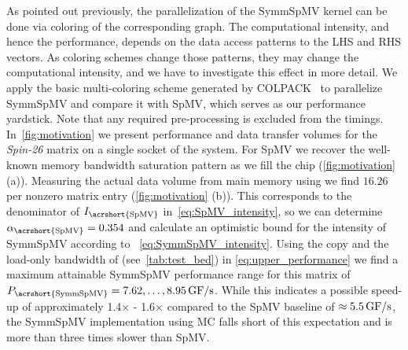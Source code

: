 
As pointed out previously, the parallelization of
the \acrshort{SymmSpMV} kernel can be done
via \DTWO coloring of the corresponding graph. The computational
intensity, and hence the performance, depends on the data access
patterns to the LHS and RHS vectors. As coloring schemes change those
patterns, they may change the computational intensity, and we have to
investigate this effect in more detail. We apply the basic
multi-coloring scheme generated by COLPACK~\cite{COLPACK} to
parallelize \acrshort{SymmSpMV} and compare it with \acrshort{SpMV},
which serves as our performance yardstick. Note that any required
pre-processing is excluded from the timings. In~\cref{fig:motivation}
we present performance and data transfer volumes for
the \emph{Spin-26} matrix on a single socket of the \IVB
system. For \acrshort{SpMV} we recover the well-known memory bandwidth
saturation pattern as we fill the chip (\cref{fig:motivation}
(a)). Measuring the actual data volume from main memory using \LIKWID
we find $16.26$ \BYTE per nonzero matrix entry (\cref{fig:motivation}
(b)). This corresponds to the denominator of
$I_\mathrm{\acrshort{SpMV}}$ in~\cref{eq:SpMV_intensity}, so we can
determine $\alpha_\mathrm{\acrshort{SpMV}}=0.354$ and calculate an 
optimistic bound for the intensity of \acrshort{SymmSpMV} according to ~\cref{eq:SymmSpMV_intensity}. Using the copy and the load-only
bandwidth of \IVB (see~\cref{tab:test_bed}) in \cref{eq:upper_performance} we find a maximum
attainable {\acrshort{SymmSpMV}} performance range for this matrix of
$P_\mathrm{\acrshort{SymmSpMV}}=7.62,\ldots,8.95\,\GF$. While this indicates a possible
speed-up of approximately 1.4$\times$ - 1.6$\times$ compared to the \acrshort{SpMV}
baseline of $\approx 5.5\,\mbox{GF/s}$, the \acrshort{SymmSpMV} implementation
using \acrfull{MC} falls short of this expectation and is more than
three times slower than \acrshort{SpMV}.
